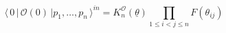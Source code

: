 \begin{equation}
\langle\,0\,|\,\mathcal{O}(0)\,|p_{1},\ldots,p_{n}\,\rangle^{in}%
=K_{n}^{\mathcal{O}}(\underline{\theta})\prod_{1\leq i<j\leq n}F(\theta
_{ij})\label{2}%
\end{equation}

